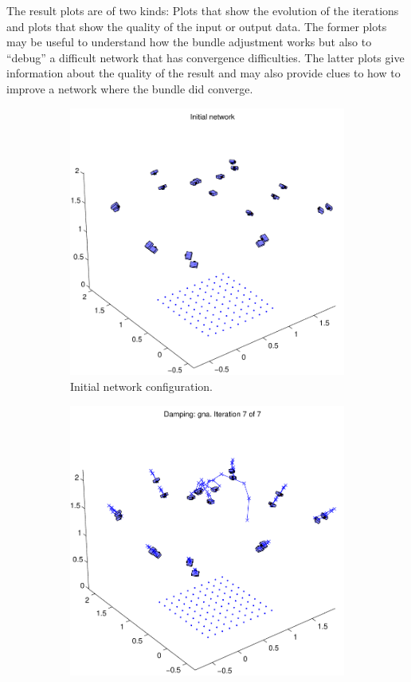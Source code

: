 \documentclass{article}
\begin{document}
The result plots are of two kinds: Plots that show the evolution of
the iterations and plots that show the quality of the input or output
data. The former plots may be useful to understand how the bundle
adjustment works but also to ``debug'' a difficult network that has
convergence difficulties. The latter plots give information about the
quality of the result and may also provide clues to how to improve a
network where the bundle did converge.

\begin{figure}
  \centering
  \begin{subfigure}[b]{0.49\textwidth}
    \includegraphics[width=\textwidth]{ill/ccamx0}
    \caption{Initial network configuration.}
    \label{fig:camx0}
  \end{subfigure}%
  \begin{subfigure}[b]{0.49\textwidth}
    \includegraphics[width=\textwidth]{ill/ccamxfinal}

\end{subfigure}
\end{figure}
\end{document}
